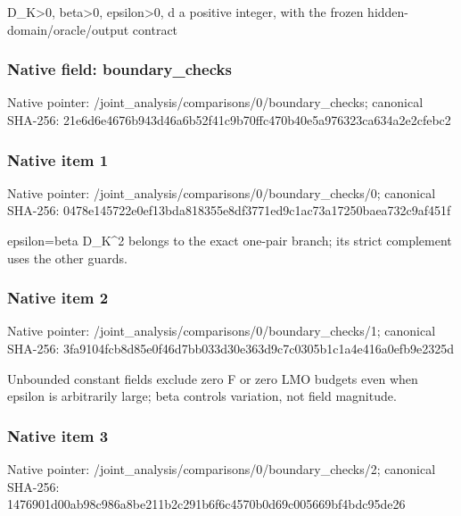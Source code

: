 \documentclass[10pt,a4paper]{article}
\begin{document}
\begingroup\raggedright\sloppy D\_\allowbreak{}K>0,\allowbreak{} beta>0,\allowbreak{} epsilon>0,\allowbreak{} d a positive integer,\allowbreak{} with the frozen hidden-domain/\allowbreak{}oracle/\allowbreak{}output contract\par\endgroup

\subsubsection{Native field: boundary\_\allowbreak{}checks}
Native pointer: /joint\_\allowbreak{}analysis/comparisons/0/boundary\_\allowbreak{}checks; canonical SHA-256: 21e6d6e4676b943d46a6b52f41c9b70ffc470b40e5a976323ca634a2e2cfebc2

\subsubsection{Native item 1}
Native pointer: /joint\_\allowbreak{}analysis/comparisons/0/boundary\_\allowbreak{}checks/0; canonical SHA-256: 0478e145722e0ef13bda818355e8df3771ed9c1ac73a17250baea732c9af451f

\begingroup\raggedright\sloppy epsilon=\allowbreak{}beta D\_\allowbreak{}K\textasciicircum{}2 belongs to the exact one-pair branch;\allowbreak{} its strict complement uses the other guards.\par\endgroup

\subsubsection{Native item 2}
Native pointer: /joint\_\allowbreak{}analysis/comparisons/0/boundary\_\allowbreak{}checks/1; canonical SHA-256: 3fa9104fcb8d85e0f46d7bb033d30e363d9c7c0305b1c1a4e416a0efb9e2325d

\begingroup\raggedright\sloppy Unbounded constant fields exclude zero F or zero LMO budgets even when epsilon is arbitrarily large;\allowbreak{} beta controls variation,\allowbreak{} not field magnitude.\par\endgroup

\subsubsection{Native item 3}
Native pointer: /joint\_\allowbreak{}analysis/comparisons/0/boundary\_\allowbreak{}checks/2; canonical SHA-256: 1476901d00ab98c986a8be211b2c291b6f6c4570b0d69c005669bf4bdc95de26
\end{document}
